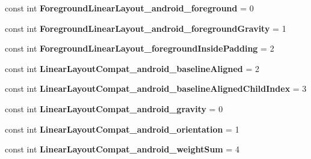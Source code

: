 \begin{DoxyCompactItemize}
\mbox{\label{class_sample_app_1_1_droid_1_1_resource_1_1_styleable_a5935deaffa6c116234565042b841eaac}} 
const int {\bfseries Foreground\+Linear\+Layout\+\_\+android\+\_\+foreground} = 0
\item 
\mbox{\label{class_sample_app_1_1_droid_1_1_resource_1_1_styleable_ae67ae3e7c59ca6395f028b97e62f7986}} 
const int {\bfseries Foreground\+Linear\+Layout\+\_\+android\+\_\+foreground\+Gravity} = 1
\item 
\mbox{\label{class_sample_app_1_1_droid_1_1_resource_1_1_styleable_a3148105ecc344648303db712348db178}} 
const int {\bfseries Foreground\+Linear\+Layout\+\_\+foreground\+Inside\+Padding} = 2
\item 
\mbox{\label{class_sample_app_1_1_droid_1_1_resource_1_1_styleable_a7472c2966f3bd7b935b20d02310eab68}} 
const int {\bfseries Linear\+Layout\+Compat\+\_\+android\+\_\+baseline\+Aligned} = 2
\item 
\mbox{\label{class_sample_app_1_1_droid_1_1_resource_1_1_styleable_a0e04f5b58903e430dc2639d0031caf53}} 
const int {\bfseries Linear\+Layout\+Compat\+\_\+android\+\_\+baseline\+Aligned\+Child\+Index} = 3
\item 
\mbox{\label{class_sample_app_1_1_droid_1_1_resource_1_1_styleable_ae1a6346da3d9a9cf3a812fd616410075}} 
const int {\bfseries Linear\+Layout\+Compat\+\_\+android\+\_\+gravity} = 0
\item 
\mbox{\label{class_sample_app_1_1_droid_1_1_resource_1_1_styleable_afefa3c52e2da8a764e9e1394887f50a9}} 
const int {\bfseries Linear\+Layout\+Compat\+\_\+android\+\_\+orientation} = 1
\item 
\mbox{\label{class_sample_app_1_1_droid_1_1_resource_1_1_styleable_a5f74934e4f2ed911201ce1d86a3813ec}} 
const int {\bfseries Linear\+Layout\+Compat\+\_\+android\+\_\+weight\+Sum} = 4

\end{DoxyCompactItemize}
